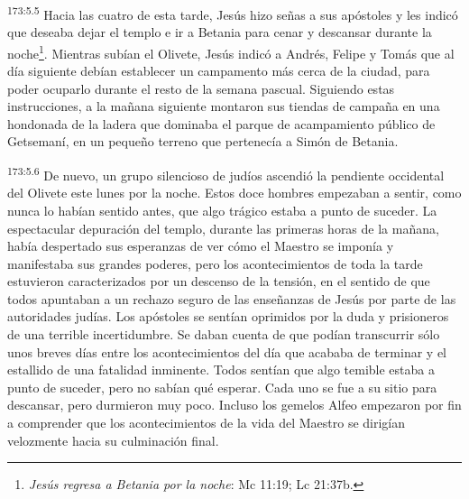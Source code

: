 \par
\textsuperscript{173:5.5} Hacia las cuatro de esta tarde, Jesús hizo señas a sus apóstoles y les indicó que deseaba dejar el templo e ir a Betania para cenar y descansar durante la noche\footnote{\textit{Jesús regresa a Betania por la noche}: Mc 11:19; Lc 21:37b.}. Mientras subían el Olivete, Jesús indicó a Andrés, Felipe y Tomás que al día siguiente debían establecer un campamento más cerca de la ciudad, para poder ocuparlo durante el resto de la semana pascual. Siguiendo estas instrucciones, a la mañana siguiente montaron sus tiendas de campaña en una hondonada de la ladera que dominaba el parque de acampamiento público de Getsemaní, en un pequeño terreno que pertenecía a Simón de Betania.

\par
\textsuperscript{173:5.6} De nuevo, un grupo silencioso de judíos ascendió la pendiente occidental del Olivete este lunes por la noche. Estos doce hombres empezaban a sentir, como nunca lo habían sentido antes, que algo trágico estaba a punto de suceder. La espectacular depuración del templo, durante las primeras horas de la mañana, había despertado sus esperanzas de ver cómo el Maestro se imponía y manifestaba sus grandes poderes, pero los acontecimientos de toda la tarde estuvieron caracterizados por un descenso de la tensión, en el sentido de que todos apuntaban a un rechazo seguro de las enseñanzas de Jesús por parte de las autoridades judías. Los apóstoles se sentían oprimidos por la duda y prisioneros de una terrible incertidumbre. Se daban cuenta de que podían transcurrir sólo unos breves días entre los acontecimientos del día que acababa de terminar y el estallido de una fatalidad inminente. Todos sentían que algo temible estaba a punto de suceder, pero no sabían qué esperar. Cada uno se fue a su sitio para descansar, pero durmieron muy poco. Incluso los gemelos Alfeo empezaron por fin a comprender que los acontecimientos de la vida del Maestro se dirigían velozmente hacia su culminación final.